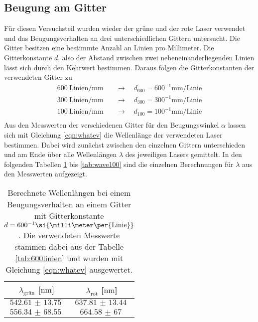 \subsection{Beugung am Gitter}
Für diesen Versuchsteil wurden wieder der grüne und der rote Laser verwendet und das Beugungsverhalten an drei unterschiedlichen Gittern untersucht. Die Gitter besitzen
eine bestimmte Anzahl an Linien pro Millimeter. Die Gitterkonstante $d$, also der Abstand zwischen zwei nebeneinanderliegenden Linien lässt sich durch den Kehrwert bestimmen. 
Daraus folgen die Gitterkonstanten der verwendeten Gitter zu
\begin{align*}
\SI{600}{{\text{Linien}}\per\milli\meter} \quad &\to \quad d_{600} = {600^{-1}}\si{\milli\meter\per{\text{Linie}}} \\
\SI{300}{{\text{Linien}}\per\milli\meter} \quad &\to \quad d_{300} = {300^{-1}}\si{\milli\meter\per{\text{Linie}}} \\
\SI{100}{{\text{Linien}}\per\milli\meter} \quad &\to \quad d_{100} = {100^{-1}}\si{\milli\meter\per{\text{Linie}}} \\
\end{align*}
Aus den Messwerten der verschiedenen Gitter für den Beugungswinkel $\alpha$ lassen sich mit Gleichung \ref{eqn:whatev} die Wellenlänge der verwendeten Laser bestimmen.
Dabei wird zunächst zwischen den einzelnen Gittern unterschieden und am Ende über alle Wellenlängen $\lambda$ des jeweiligen Lasers gemittelt.
In den folgenden Tabellen \ref{tab:wave600} bis \ref{tab:wave100} sind die einzelnen Berechnungen für $\lambda$ aus den Messwerten aufgezeigt.

\begin{table}
    \centering
    \caption{Berechnete Wellenlängen bei einem Beugungsverhalten an einem Gitter mit Gitterkonstante $\protect d = {600^{-1}}\si{\milli\meter\per{\text{Linie}}}$. Die verwendeten Messwerte stammen dabei aus der Tabelle \ref{tab:600linien} und wurden mit Gleichung 
    \ref{eqn:whatev} ausgewertet.}
    \label{tab:wave600}
    \begin{tabular}{c c}
        \toprule
        $\lambda_{\text{grün}}$ [$\si{\nano\meter}$] & $\lambda_{\text{rot}}$ [$\si{\nano\meter}$] \\
        \midrule
        $\SI{542.61(1375)}{}$ & $\SI{637.81(1344)}{}$ \\
        $\SI{556.34(6855)}{}$ & $\SI{664.58(6700)}{}$  \\
        \bottomrule    
    \end{tabular}
\end{table}

